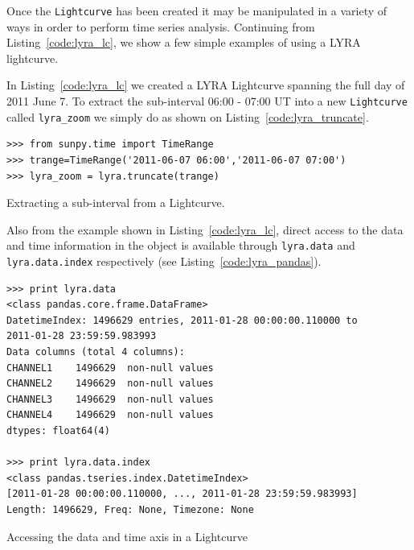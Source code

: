 Once the \texttt{Lightcurve} has been created it may be manipulated in
a variety of ways in order to perform time series analysis.
Continuing from Listing~\ref{code:lyra_lc}, we show a few simple
examples of using a LYRA lightcurve.

In Listing~\ref{code:lyra_lc} we created a LYRA Lightcurve spanning
the full day of 2011 June 7.  To extract the sub-interval 06:00 -
07:00 UT into a new \texttt{Lightcurve} called \texttt{lyra\_zoom} we
simply do as shown on Listing~\ref{code:lyra_truncate}.

\begin{listing}[H]
\begin{verbatim}
>>> from sunpy.time import TimeRange
>>> trange=TimeRange('2011-06-07 06:00','2011-06-07 07:00')
>>> lyra_zoom = lyra.truncate(trange)
\end{verbatim}
\caption{Extracting a sub-interval from a Lightcurve.}
\label{code:lyra_truncate}
\end{listing}

Also from the example shown in Listing~\ref{code:lyra_lc}, direct access to 
the data and time information in the object is available through 
\texttt{lyra.data} and \texttt{lyra.data.index} respectively 
(see Listing~\ref{code:lyra_pandas}).

\begin{listing}[H]
\begin{verbatim}
>>> print lyra.data
<class pandas.core.frame.DataFrame>
DatetimeIndex: 1496629 entries, 2011-01-28 00:00:00.110000 to 
2011-01-28 23:59:59.983993
Data columns (total 4 columns):
CHANNEL1    1496629  non-null values
CHANNEL2    1496629  non-null values
CHANNEL3    1496629  non-null values
CHANNEL4    1496629  non-null values
dtypes: float64(4)

>>> print lyra.data.index
<class pandas.tseries.index.DatetimeIndex>
[2011-01-28 00:00:00.110000, ..., 2011-01-28 23:59:59.983993]
Length: 1496629, Freq: None, Timezone: None
\end{verbatim}
\caption{Accessing the data and time axis in a Lightcurve}
\label{code:lyra_pandas}
\end{listing}
